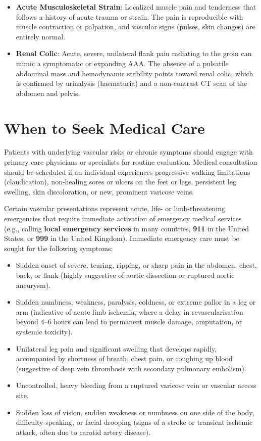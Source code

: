 \begin{itemize}
    \item \textbf{Acute Musculoskeletal Strain}: Localized muscle pain and tenderness that follows a history of acute trauma or strain. The pain is reproducible with muscle contraction or palpation, and vascular signs (pulses, skin changes) are entirely normal.
    \item \textbf{Renal Colic}: Acute, severe, unilateral flank pain radiating to the groin can mimic a symptomatic or expanding AAA. The absence of a pulsatile abdominal mass and hemodynamic stability points toward renal colic, which is confirmed by urinalysis (haematuria) and a non-contrast CT scan of the abdomen and pelvis.
\end{itemize}

\section*{When to Seek Medical Care}
Patients with underlying vascular risks or chronic symptoms should engage with primary care physicians or specialists for routine evaluation. Medical consultation should be scheduled if an individual experiences progressive walking limitations (claudication), non-healing sores or ulcers on the feet or legs, persistent leg swelling, skin discoloration, or new, prominent varicose veins.

Certain vascular presentations represent acute, life- or limb-threatening emergencies that require immediate activation of emergency medical services (e.g., calling \textbf{local emergency services} in many countries, \textbf{911} in the United States, or \textbf{999} in the United Kingdom). Immediate emergency care must be sought for the following symptoms:
\begin{itemize}
    \item Sudden onset of severe, tearing, ripping, or sharp pain in the abdomen, chest, back, or flank (highly suggestive of aortic dissection or ruptured aortic aneurysm).
    \item Sudden numbness, weakness, paralysis, coldness, or extreme pallor in a leg or arm (indicative of acute limb ischemia, where a delay in revascularisation beyond 4--6 hours can lead to permanent muscle damage, amputation, or systemic toxicity).
    \item Unilateral leg pain and significant swelling that develops rapidly, accompanied by shortness of breath, chest pain, or coughing up blood (suggestive of deep vein thrombosis with secondary pulmonary embolism).
    \item Uncontrolled, heavy bleeding from a ruptured varicose vein or vascular access site.
    \item Sudden loss of vision, sudden weakness or numbness on one side of the body, difficulty speaking, or facial drooping (signs of a stroke or transient ischemic attack, often due to carotid artery disease).
\end{itemize}

